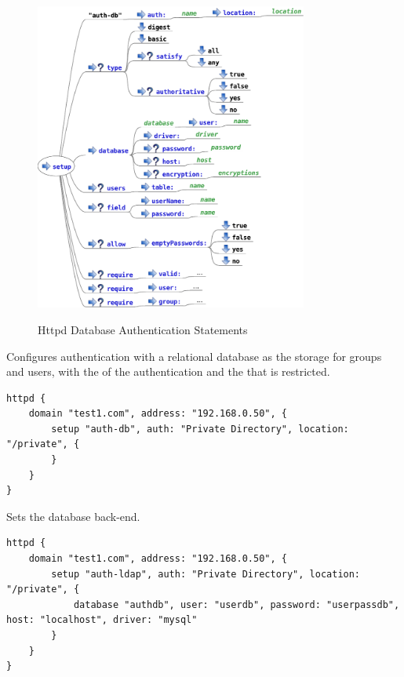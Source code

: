 \begin{figure}[htp]
\centering
\includegraphics[width=0.8\textwidth]{httpd_setup_auth_db_script}
\label{fig:httpd_setup_auth_db_script}
\caption{Httpd Database Authentication Statements}
\end{figure}


Configures authentication with a relational database as the storage for groups and users,
with the  of the authentication and the  that is 
restricted.

\begin{lstlisting}[style=Java]
httpd {
    domain "test1.com", address: "192.168.0.50", {
        setup "auth-db", auth: "Private Directory", location: "/private", {
        }
    }
}
\end{lstlisting}


Sets the database back-end.

\begin{lstlisting}[style=Java]
httpd {
    domain "test1.com", address: "192.168.0.50", {
        setup "auth-ldap", auth: "Private Directory", location: "/private", {
            database "authdb", user: "userdb", password: "userpassdb", host: "localhost", driver: "mysql"
        }
    }
}
\end{lstlisting}

